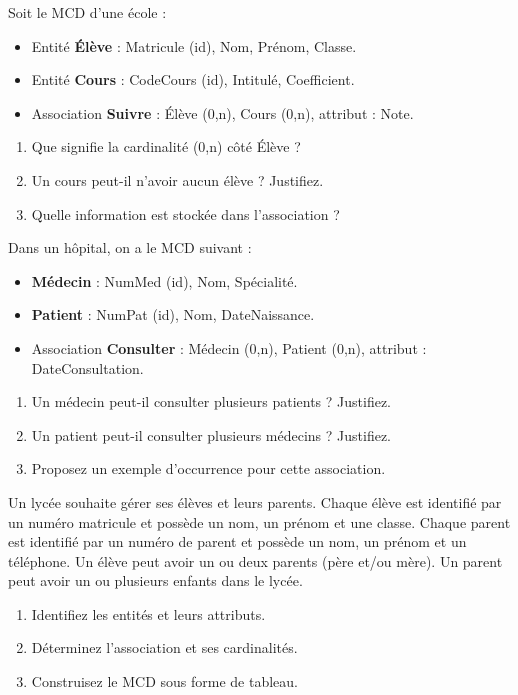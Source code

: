 \exo{}
Soit le MCD d'une école :
\begin{itemize}
    \item Entité \textbf{Élève} : Matricule (id), Nom, Prénom, Classe.
    \item Entité \textbf{Cours} : CodeCours (id), Intitulé, Coefficient.
    \item Association \textbf{Suivre} : Élève (0,n), Cours (0,n), attribut : Note.
\end{itemize}
\begin{enumerate}
    \item Que signifie la cardinalité (0,n) côté Élève ?
    \item Un cours peut-il n'avoir aucun élève ? Justifiez.
    \item Quelle information est stockée dans l'association ?
\end{enumerate}

\exo{}
Dans un hôpital, on a le MCD suivant :
\begin{itemize}
    \item \textbf{Médecin} : NumMed (id), Nom, Spécialité.
    \item \textbf{Patient} : NumPat (id), Nom, DateNaissance.
    \item Association \textbf{Consulter} : Médecin (0,n), Patient (0,n), attribut : DateConsultation.
\end{itemize}
\begin{enumerate}
    \item Un médecin peut-il consulter plusieurs patients ? Justifiez.
    \item Un patient peut-il consulter plusieurs médecins ? Justifiez.
    \item Proposez un exemple d'occurrence pour cette association.
\end{enumerate}


\exo{}
Un lycée souhaite gérer ses élèves et leurs parents. Chaque élève est identifié par un numéro matricule et possède un nom, un prénom et une classe. Chaque parent est identifié par un numéro de parent et possède un nom, un prénom et un téléphone. Un élève peut avoir un ou deux parents (père et/ou mère). Un parent peut avoir un ou plusieurs enfants dans le lycée.
\begin{enumerate}
    \item Identifiez les entités et leurs attributs.
    \item Déterminez l'association et ses cardinalités.
    \item Construisez le MCD sous forme de tableau.
\end{enumerate}

